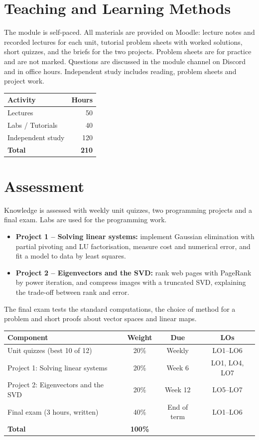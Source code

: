 \documentclass[11pt,a4paper]{article}
\begin{document}
\section{Teaching and Learning Methods}
The module is self-paced. All materials are provided on Moodle: lecture notes and
recorded lectures for each unit, tutorial problem sheets with worked solutions,
short quizzes, and the briefs for the two projects. Problem sheets are for practice
and are not marked. Questions are discussed in the module channel on Discord and in
office hours. Independent study includes reading, problem sheets and project work.

\begin{tabularx}{0.6\textwidth}{X r}
\toprule
\textbf{Activity} & \textbf{Hours} \\
\midrule
Lectures            & 50 \\
Labs / Tutorials    & 40 \\
Independent study   & 120 \\
\midrule
\textbf{Total}      & \textbf{210} \\
\bottomrule
\end{tabularx}

\section{Assessment}
Knowledge is assessed with weekly unit quizzes, two programming projects
and a final exam. Labs are used for the programming work.
\begin{itemize}
  \item \textbf{Project 1 -- Solving linear systems:} implement Gaussian elimination
        with partial pivoting and LU factorisation, measure cost and numerical error,
        and fit a model to data by least squares.
  \item \textbf{Project 2 -- Eigenvectors and the SVD:} rank web pages with
        PageRank by power iteration, and compress images with a truncated SVD,
        explaining the trade-off between rank and error.
\end{itemize}
The final exam tests the standard computations, the choice of method for a problem
and short proofs about vector spaces and linear maps.

\begin{tabularx}{\textwidth}{X c c c}
\toprule
\textbf{Component} & \textbf{Weight} & \textbf{Due} & \textbf{LOs} \\
\midrule
Unit quizzes (best 10 of 12) & 20\% & Weekly & LO1--LO6 \\
Project 1: Solving linear systems & 20\% & Week 6 & LO1, LO4, LO7 \\
Project 2: Eigenvectors and the SVD & 20\% & Week 12 & LO5--LO7 \\
Final exam (3 hours, written) & 40\% & End of term & LO1--LO6 \\
\midrule
\textbf{Total}      & \textbf{100\%} & & \\
\bottomrule
\end{tabularx}
\end{document}
